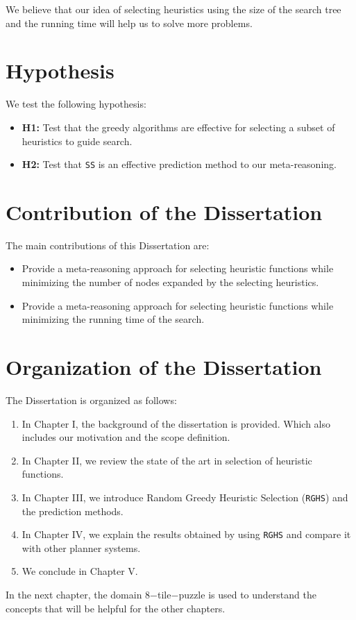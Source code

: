 We believe that our idea of selecting heuristics using the size of the search tree and the running time will help us to solve more problems.

\section{Hypothesis}
\noindent
We test the following hypothesis:
\begin{itemize}
\item \textbf{H1:} Test that the greedy algorithms are effective for selecting a subset of heuristics to guide search.

\item \textbf{H2:} Test that \texttt{SS} is an effective prediction method to our meta-reasoning.
\end{itemize}

\section{Contribution of the Dissertation}
\noindent
The main contributions of this Dissertation are:
\begin{itemize}
\item Provide a meta-reasoning approach for selecting heuristic functions while minimizing the number of nodes expanded by the selecting heuristics.

\item Provide a meta-reasoning approach for selecting heuristic functions while minimizing the running time of the search. 
\end{itemize}

\section{Organization of the Dissertation}
\noindent
The Dissertation is organized as follows: 
\begin{enumerate}
\item In Chapter I, the background of the dissertation is provided. Which also includes our motivation and the scope definition.
\item In Chapter II, we review the state of the art in selection of heuristic functions.
\item In Chapter III, we introduce Random Greedy Heuristic Selection (\texttt{RGHS}) and the prediction methods. 
\item In Chapter IV, we explain the results obtained by using \texttt{RGHS} and compare it with other planner systems.
\item We conclude in Chapter V.
\end{enumerate}

In the next chapter, the domain 8$-$tile$-$puzzle is used to understand the concepts that will be helpful for the other chapters. \\

\clearpage